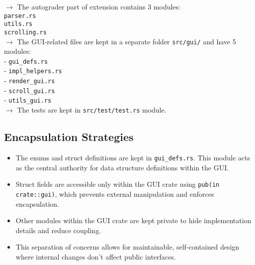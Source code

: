 \documentclass{article}
\begin{document}
$\rightarrow$ The autograder part of extension contains 3 modules:\\
\hspace*{5mm}\texttt{parser.rs}\\
\hspace*{5mm}\texttt{utils.rs}\\
\hspace*{5mm}\texttt{scrolling.rs}\\

$\rightarrow$ The GUI-related files are kept in a separate folder \texttt{src/gui/} and have 5 modules:\\
\hspace*{5mm}- \texttt{gui\_defs.rs}\\
\hspace*{5mm}- \texttt{impl\_helpers.rs}\\
\hspace*{5mm}- \texttt{render\_gui.rs}\\
\hspace*{5mm}- \texttt{scroll\_gui.rs}\\
\hspace*{5mm}- \texttt{utils\_gui.rs}\\

$\rightarrow$ The tests are kept in \texttt{src/test/test.rs} module.

\subsection{Encapsulation Strategies}
\label{sec:encapsulation}

\begin{itemize}
    \item The enums and struct definitions are kept in \texttt{gui\_defs.rs}. This module acts as the central authority for data structure definitions within the GUI.
    
    \item Struct fields are accessible only within the GUI crate using \texttt{pub(in crate::gui)}, which prevents external manipulation and enforces encapsulation.
    
    \item Other modules within the GUI crate are kept private to hide implementation details and reduce coupling.
    
    \item This separation of concerns allows for maintainable, self-contained design where internal changes don’t affect public interfaces.
\end{itemize}
\end{document}

